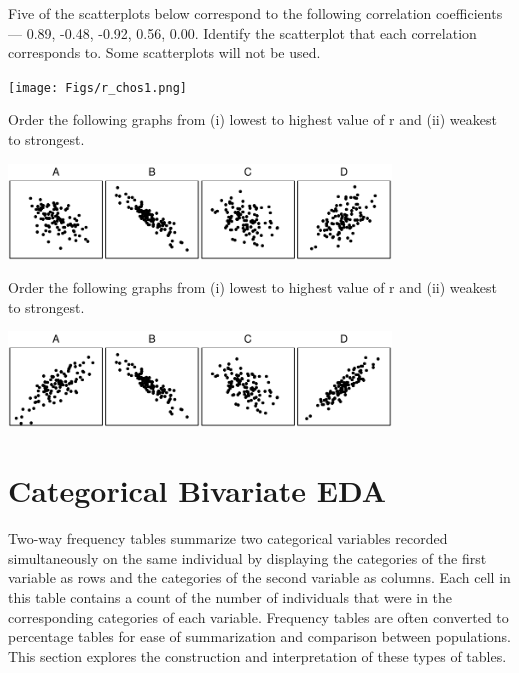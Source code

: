 \documentclass[10pt,openany]{book}\usepackage[]{graphicx}\usepackage[]{color}
\begin{document}
\begin{exsection}
  \item \label{revex:qbEDArChos1} Five of the scatterplots below correspond to the following correlation coefficients --- 0.89, -0.48, -0.92, 0.56, 0.00. Identify the scatterplot that each correlation corresponds to. Some scatterplots will not be used. 
\begin{center}
  \texttt{[image: Figs/r\_chos1.png]}
\end{center}

  \item \label{revex:qbEDArChos2} Order the following graphs from (i) lowest to highest value of r and (ii) weakest to strongest.  

\begin{center}
  \includegraphics[width=4in]{Figs/RChoose1-1}
\end{center}

  \item \label{revex:qbEDArChos3} Order the following graphs from (i) lowest to highest value of r and (ii) weakest to strongest. 

\begin{center}
  \includegraphics[width=4in]{Figs/RChoose2-1}
\end{center}
\end{exsection}


\section{Categorical Bivariate EDA}   \label{sect:BEDACategorical}
Two-way frequency tables summarize two categorical variables recorded simultaneously on the same individual by displaying the categories of the first variable as rows and the categories of the second variable as columns.  Each cell in this table contains a count of the number of individuals that were in the corresponding categories of each variable.  Frequency tables are often converted to percentage tables for ease of summarization and comparison between populations.  This section explores the construction and interpretation of these types of tables.
\end{document}
